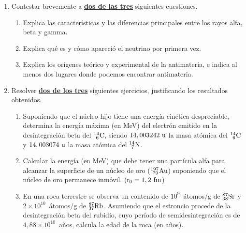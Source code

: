 \documentclass[11pt]{articulo}
\begin{document}
\begin{enumerate}

\item Contestar brevemente a {\bf\underline{dos de las tres}} siguientes cuestiones.

\begin{enumerate}
\item Explica las caracter\'isticas y las diferencias principales entre los rayos alfa, beta y gamma.
\item Explica qu\'e es y c\'omo apareci\'o el neutrino por primera vez.
\item Explica los or\'igenes te\'orico y experimental de la antimateria, e indica al menos dos lugares donde podemos encontrar antimateria.
\end{enumerate}

\item Resolver {\bf\underline{dos de los tres}} siguientes ejercicios, justificando los resultados obtenidos.

\begin{enumerate}

\item Suponiendo que el n\'ucleo hijo tiene una energ\'ia cin\'etica despreciable, determina la energ\'ia m\'axima (en MeV) del electr\'on emitido en la desintegraci\'on beta del ${\rm _{~6}^{14}C}$, siendo ${\rm 14,003242~u}$ la masa at\'omica del ${\rm _{~6}^{14}C}$ y ${\rm 14,003074~u}$ la masa at\'omica del ${\rm _{~7}^{14}N}$.

\item Calcular la energ\'ia (en MeV) que debe tener una part\'icula alfa para alcanzar la superficie de un n\'ucleo de oro (${\rm _{~79}^{197}Au}$) suponiendo que el n\'ucleo de oro permanece inm\'ovil. (${\rm r_0 = 1,2~fm}$)

\item En una roca terrestre se observa un contenido de $10^9$~\'atomos/g de ${\rm _{38}^{87}Sr}$ y $2 \times 10^{10}$~\'atomos/g de ${\rm _{37}^{87}Rb}$. Asumiendo que el estroncio procede de la desintegraci\'on beta del rubidio, cuyo per\'iodo de semidesintegraci\'on es de $4,88 \times 10^{10}$~a\~{n}os, calcula la edad de la roca (en a\~{n}os).

\end{enumerate}
\end{enumerate}


\vspace*{0.25cm}
\end{document}
